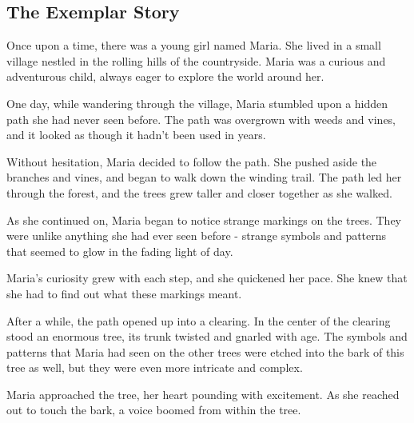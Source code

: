 \documentclass[a4paper]{article}
\begin{document}
\subsection*{The Exemplar Story}\label{app:exemplar-story}

\sffamily
\small
\vspace{1ex}
Once upon a time, there was a young girl named Maria. She lived in a small village nestled in the rolling hills of the countryside. Maria was a curious and adventurous child, always eager to explore the world around her.
\vspace{1ex}

\hspace{10pt} One day, while wandering through the village, Maria stumbled upon a hidden path she had never seen before. The path was overgrown with weeds and vines, and it looked as though it hadn't been used in years.
\vspace{1ex}

\hspace{10pt} Without hesitation, Maria decided to follow the path. She pushed aside the branches and vines, and began to walk down the winding trail. The path led her through the forest, and the trees grew taller and closer together as she walked.
\vspace{1ex}

\hspace{10pt} As she continued on, Maria began to notice strange markings on the trees. They were unlike anything she had ever seen before - strange symbols and patterns that seemed to glow in the fading light of day.
\vspace{1ex}

\hspace{10pt} Maria's curiosity grew with each step, and she quickened her pace. She knew that she had to find out what these markings meant.
\vspace{1ex}

\hspace{10pt} After a while, the path opened up into a clearing. In the center of the clearing stood an enormous tree, its trunk twisted and gnarled with age. The symbols and patterns that Maria had seen on the other trees were etched into the bark of this tree as well, but they were even more intricate and complex.
\vspace{1ex}

\hspace{10pt} Maria approached the tree, her heart pounding with excitement. As she reached out to touch the bark, a voice boomed from within the tree.
\vspace{1ex}
\end{document}
